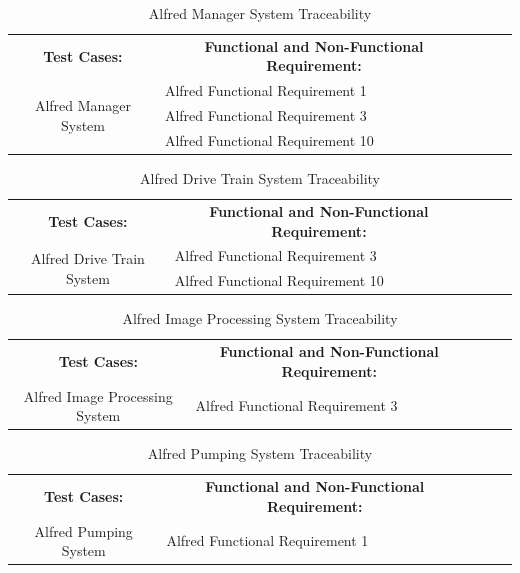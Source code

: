 \documentclass [10pt]{article}
\begin{document}
\begin{table}[h!]
\centering
\begin{tabular}{lllll}
\cline{1-2}
\multicolumn{1}{|c|}{\textbf{Test Cases:}} & \multicolumn{1}{c|}{\textbf{Functional and Non-Functional Requirement:}} &  &  &  \\ \cline{1-2}
\multicolumn{1}{|c|}{\multirow{3}{*}{Alfred Manager System}} & \multicolumn{1}{l|}{Alfred Functional Requirement 1} &  &  &  \\ \cline{2-2}
\multicolumn{1}{|c|}{} & \multicolumn{1}{l|}{Alfred Functional Requirement 3} &  &  &  \\ \cline{2-2}
\multicolumn{1}{|c|}{} & \multicolumn{1}{l|}{Alfred Functional Requirement 10} &  &  &  \\ \cline{1-2}
\end{tabular}
\caption{Alfred Manager System Traceability}
\end{table}

\begin{table}[h!]
\centering
\begin{tabular}{lllll}
\cline{1-2}
\multicolumn{1}{|c|}{\textbf{Test Cases:}} & \multicolumn{1}{c|}{\textbf{Functional and Non-Functional Requirement:}} &  &  &  \\ \cline{1-2}
\multicolumn{1}{|c|}{\multirow{2}{*}{Alfred Drive Train System}} & \multicolumn{1}{l|}{Alfred Functional Requirement 3} &  &  &  \\ \cline{2-2}
\multicolumn{1}{|c|}{} & \multicolumn{1}{l|}{Alfred Functional Requirement 10} &  &  &  \\ \cline{1-2}
\end{tabular}
\caption{Alfred Drive Train System Traceability}
\end{table}

\begin{table}[h!]
\centering
\begin{tabular}{lllll}
\cline{1-2}
\multicolumn{1}{|c|}{\textbf{Test Cases:}} & \multicolumn{1}{c|}{\textbf{Functional and Non-Functional Requirement:}} &  &  &  \\ \cline{1-2}
\multicolumn{1}{|c|}{\multirow{1}{*}{Alfred Image Processing System}} & \multicolumn{1}{l|}{Alfred Functional Requirement 3} &  &  &  \\ \cline{1-2}
\end{tabular}
\caption{Alfred Image Processing System Traceability}
\end{table}

\begin{table}[h!]
\centering
\begin{tabular}{lllll}
\cline{1-2}
\multicolumn{1}{|c|}{\textbf{Test Cases:}} & \multicolumn{1}{c|}{\textbf{Functional and Non-Functional Requirement:}} &  &  &  \\ \cline{1-2}
\multicolumn{1}{|c|}{\multirow{1}{*}{Alfred Pumping System}} & \multicolumn{1}{l|}{Alfred Functional Requirement 1} &  &  &  \\ \cline{1-2}
\end{tabular}
\caption{Alfred Pumping System Traceability}
\end{table}
\end{document}
